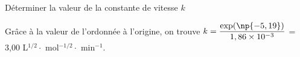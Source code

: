 
\begin{enonce}
Déterminer la valeur de la constante de vitesse $k$
\end{enonce}


\begin{corrige}
Grâce à la valeur de l'ordonnée à l'origine, on trouve $k = \dfrac{\exp(\np{-5,19})}{1,86 \times 10^{-3}}$ = 3,00 L$^{1/2} \cdot$ mol$^{-1/2}\cdot$ min$^{-1}$.
\end{corrige}


\finEntrainement


\afficheReponsesMelangees

\finFicheEntrainement                                                                        %


\ifdefined\mainIsLoaded\else
\printReponsesEtCorriges
\fi

